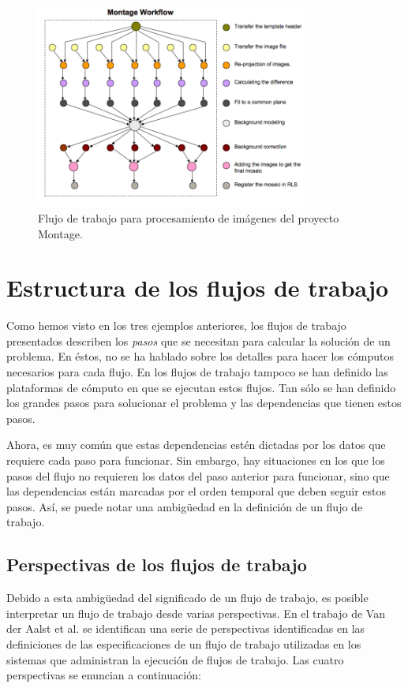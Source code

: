 \begin{figure}
    \begin{center}
        \includegraphics[width=0.8\textwidth]{imagenes/montage-workflow}
    \end{center}
    \caption{Flujo de trabajo para procesamiento de imágenes del proyecto Montage.}
    \label{fig:montage-workflow}
\end{figure}



\section{Estructura de los flujos de trabajo}
Como hemos visto en los tres ejemplos anteriores, los flujos de trabajo presentados describen los \emph{pasos} que se necesitan para calcular la solución de un problema. En éstos, no se ha hablado sobre los detalles para hacer los cómputos necesarios para cada flujo. En los flujos de trabajo tampoco se han definido las plataformas de cómputo en que se ejecutan estos flujos. Tan sólo se han definido los grandes pasos para solucionar el problema y las dependencias que tienen estos pasos. 

Ahora, es muy común que estas dependencias estén dictadas por los datos que requiere cada paso para funcionar. Sin embargo, hay situaciones en los que los pasos del flujo no requieren los datos del paso anterior para funcionar, sino que las dependencias están marcadas por el orden temporal que deben seguir estos pasos. Así, se puede notar una ambigüedad en la definición de un flujo de trabajo.

\subsection{Perspectivas de los flujos de trabajo}
Debido a esta ambigüedad del significado de un flujo de trabajo, es posible interpretar un flujo de trabajo desde varias perspectivas. En el trabajo de Van der Aalst et al. \cite{van2003workflow} se identifican una serie de perspectivas identificadas en las definiciones de las especificaciones de un flujo de trabajo utilizadas en los sistemas que administran la ejecución de flujos de trabajo. Las cuatro perspectivas se enuncian a continuación:

